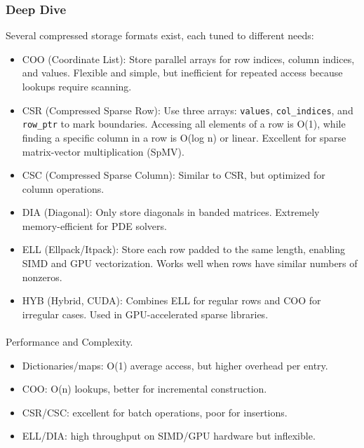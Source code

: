 \documentclass[
  letterpaper,
  DIV=11,
  numbers=noendperiod]{scrreprt}
\makeatletter
\let\oldparagraph\paragraph
\renewcommand{\paragraph}{
    \@ifstar
      \xxxParagraphStar
      \xxxParagraphNoStar
  }
\newcommand{\xxxParagraphStar}[1]{\oldparagraph*{#1}\mbox{}}
\newcommand{\xxxParagraphNoStar}[1]{\oldparagraph{#1}\mbox{}}
\providecommand{\tightlist}{%
  \setlength{\itemsep}{0pt}\setlength{\parskip}{0pt}}
\makeatother
\begin{document}
\subsubsection{Deep Dive}\label{deep-dive-17}

Several compressed storage formats exist, each tuned to different needs:

\begin{itemize}
\tightlist
\item
  COO (Coordinate List): Store parallel arrays for row indices, column
  indices, and values. Flexible and simple, but inefficient for repeated
  access because lookups require scanning.
\item
  CSR (Compressed Sparse Row): Use three arrays: \texttt{values},
  \texttt{col\_indices}, and \texttt{row\_ptr} to mark boundaries.
  Accessing all elements of a row is O(1), while finding a specific
  column in a row is O(log n) or linear. Excellent for sparse
  matrix-vector multiplication (SpMV).
\item
  CSC (Compressed Sparse Column): Similar to CSR, but optimized for
  column operations.
\item
  DIA (Diagonal): Only store diagonals in banded matrices. Extremely
  memory-efficient for PDE solvers.
\item
  ELL (Ellpack/Itpack): Store each row padded to the same length,
  enabling SIMD and GPU vectorization. Works well when rows have similar
  numbers of nonzeros.
\item
  HYB (Hybrid, CUDA): Combines ELL for regular rows and COO for
  irregular cases. Used in GPU-accelerated sparse libraries.
\end{itemize}

\paragraph{Performance and
Complexity.}\label{performance-and-complexity.}

\begin{itemize}
\tightlist
\item
  Dictionaries/maps: O(1) average access, but higher overhead per entry.
\item
  COO: O(n) lookups, better for incremental construction.
\item
  CSR/CSC: excellent for batch operations, poor for insertions.
\item
  ELL/DIA: high throughput on SIMD/GPU hardware but inflexible.
\end{itemize}
\end{document}
